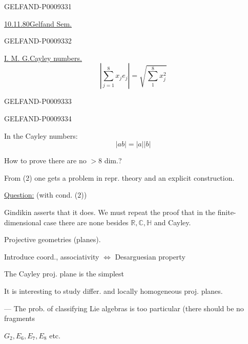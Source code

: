 \begin{GelfandAdjacentEvidence}{GELFAND-P000933}{1}

\underline{\underline{10.11.80}}\qquad\underline{Gelfand Sem.}
\end{GelfandAdjacentEvidence}
\begin{GelfandAdjacentEvidence}{GELFAND-P000933}{2}


\underline{I. M. G.}\qquad\underline{\underline{Cayley numbers.}}
\begin{equation*}
 \left|\sum_{j=1}^{8}x_j e_j\right|=\sqrt{\sum_{1}^{8}x_j^2}
 \tag{1}
\end{equation*}
\end{GelfandAdjacentEvidence}
\begin{GelfandAdjacentEvidence}{GELFAND-P000933}{3}

\end{GelfandAdjacentEvidence}
\begin{GelfandAdjacentEvidence}{GELFAND-P000933}{4}


In the Cayley numbers:
\begin{equation*}
 |ab|=|a||b|
 \tag{2}
\end{equation*}

How to prove there are no $>8$ dim.?

From (2) one gets a problem in repr. theory and an explicit construction.

\underline{Question:}  (with cond. (2))

Gindikin asserts that it does. We must repeat the proof that in the finite-dimensional case there are none besides $\mathbb R,\mathbb C,\mathbb H$ and Cayley.

Projective geometries (planes).

Introduce coord., associativity $\Leftrightarrow$ Desarguesian property

The Cayley proj. plane is the simplest 

It is interesting to study differ. and locally homogeneous proj. planes.

--- The prob. of classifying Lie algebras is too particular (there should be no fragments

\hfill $G_2,E_6,E_7,E_8$ etc.
\end{GelfandAdjacentEvidence}
